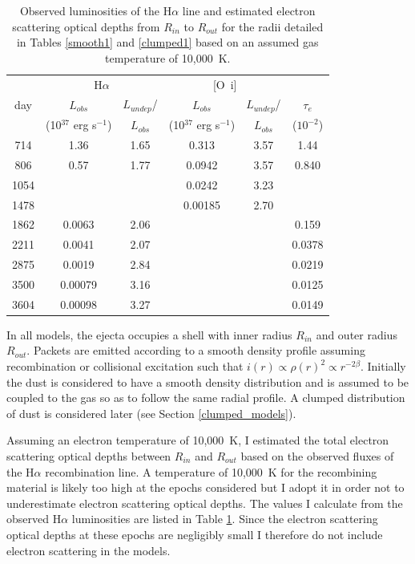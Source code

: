 \setlength{\tabcolsep}{10pt}
\begin{table}
\caption{Observed luminosities of the H$\alpha$ line and estimated 
electron scattering optical depths from $R_{in}$ to $R_{out}$ for the 
radii detailed in Tables \ref{smooth1} and \ref{clumped1} based on an 
assumed gas temperature of 10,000~K.}
\centering
\begin{tabular}{@{}cccccc@{}}
\hline
& \multicolumn{2}{c}{H$\alpha$} &  \multicolumn{2}{c}{[O~{\sc i}]}  \\
day &  $L_{obs}$ & $L_{undep}$/  &  $L_{obs}$ & $L_{undep}$/   & $\tau_e$ \\
& (10$^{37}$ erg s$^{-1}$) &$L_{obs}$& (10$^{37}$ erg s$^{-1}$) & $L_{obs}$& ($10^{-2}$) \\
\hline
714 & 1.36 & 1.65 &0.313&3.57& 1.44  \\
806 & 0.57 & 1.77 &0.0942&3.57& 0.840 \\
1054 &&&0.0242 & 3.23\\
1478 &&& 0.00185&2.70 \\
1862 & 0.0063 & 2.06 &&& 0.159  \\
2211 & 0.0041 & 2.07 &&& 0.0378  \\
2875 & 0.0019 & 2.84 & & &0.0219  \\
3500 & 0.00079 & 3.16 & &&0.0125  \\
3604 & 0.00098 & 3.27 &&&0.0149  \\

\hline
\end{tabular}

\label{tau_e}
\end{table}%
\setlength{\tabcolsep}{8pt}


In all models, the ejecta occupies a shell with inner radius $R_{in}$ and 
outer radius $R_{out}$.  Packets are emitted according to a smooth density 
profile assuming recombination or collisional excitation such that $i(r) 
\propto \rho(r)^2 \propto r^{-2\beta}$.  Initially the dust is considered 
to have a smooth density distribution and is assumed to be coupled to the 
gas so as to follow the same radial profile.  A clumped distribution of 
dust is considered later (see Section \ref{clumped_models}).

Assuming an electron temperature of 10,000~K, I estimated the total electron scattering optical depths between $R_{in}$ and $R_{out}$ based on the 
observed fluxes of the H$\alpha$ recombination line. A temperature of 10,000~K for the recombining material is 
likely too high at the epochs considered but I adopt it in order
not to underestimate electron scattering optical depths.  The values 
I calculate from the observed H$\alpha$ luminosities are listed in Table 
\ref{tau_e}.  Since the electron scattering optical depths at these epochs 
are negligibly small I therefore do not include electron scattering in 
the models.




